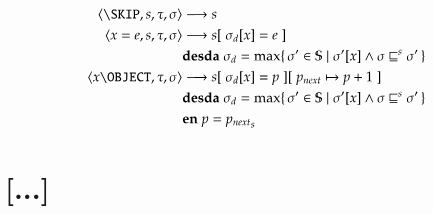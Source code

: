 \documentclass[11pt,oneside,parskip=half]{scrbook}
\newcommand{\<}
  {\ensuremath{\langle}}
\renewcommand{\>}
  {\ensuremath{\rangle}}
\def\OuterEq{\sqsubseteq^s}
\begin{document}
\begin{align*}
	\left<\SKIP, s, \tau, \sigma\right> &\longrightarrow s \\
	\left<x = e, s, \tau, \sigma\right> &\longrightarrow s[\; \sigma_d[x] = e \;] \\
	& \textbf{desda}\; \sigma_d = \max \{\, \sigma' \in \mathbb{S} \mid \sigma'[x] \land \sigma \OuterEq \sigma' \,\} \\
	\left<x \OBJECT, \tau, \sigma\right> &\longrightarrow s[\; \sigma_d[x] = p \;][\; p_\mathit{next} \mapsto p + 1 \;] \\
	& \textbf{desda}\; \sigma_d = \max \{\, \sigma' \in \mathbb{S} \mid \sigma'[x] \land \sigma \OuterEq \sigma' \,\} \\
	& \textbf{en}\; p = {p_\mathit{next}}_s
\end{align*}

\chapter{[...]}

%
%
%

\backmatter
\end{document}

